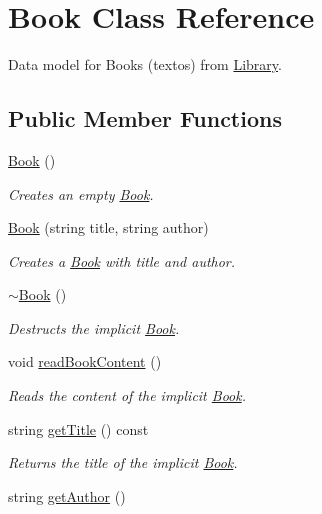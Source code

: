 \hypertarget{class_book}{}\section{Book Class Reference}
\label{class_book}


Data model for Books (textos) from \hyperlink{class_library}{Library}.  


\subsection*{Public Member Functions}
\begin{DoxyCompactItemize}
\item 
\hyperlink{class_book_a2eac9e235a08763158f78533f7a83e1f}{Book} ()
\begin{DoxyCompactList}\small\item\em Creates an empty \hyperlink{class_book}{Book}. \end{DoxyCompactList}\item 
\hyperlink{class_book_a98dad89c9f945e0d846c81ce7e459fbc}{Book} (string title, string author)
\begin{DoxyCompactList}\small\item\em Creates a \hyperlink{class_book}{Book} with title and author. \end{DoxyCompactList}\item 
\hyperlink{class_book_a0ba8eceb34ea1301bc08942e37824767}{$\sim$\+Book} ()
\begin{DoxyCompactList}\small\item\em Destructs the implicit \hyperlink{class_book}{Book}. \end{DoxyCompactList}\item 
void \hyperlink{class_book_a3e62d70f19bf6fa8ebef5556882b3ed7}{read\+Book\+Content} ()
\begin{DoxyCompactList}\small\item\em Reads the content of the implicit \hyperlink{class_book}{Book}. \end{DoxyCompactList}\item 
string \hyperlink{class_book_aa3dc09f8db785a89259a0e491292987d}{get\+Title} () const 
\begin{DoxyCompactList}\small\item\em Returns the title of the implicit \hyperlink{class_book}{Book}. \end{DoxyCompactList}\item 
string \hyperlink{class_book_a25ca75983de43cbad4386a470b709f9f}{get\+Author} ()

\end{DoxyCompactItemize}
